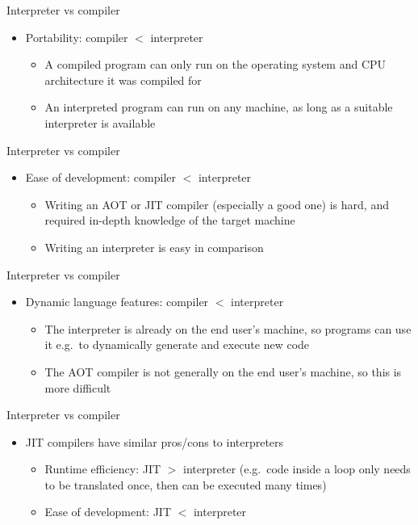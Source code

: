 \begin{frame}{Interpreter vs compiler}
    \begin{itemize}
        \item Portability: compiler $<$ interpreter \pause
        \begin{itemize}
            \item A compiled program can only run on the operating system and CPU architecture it was compiled for \pause
            \item An interpreted program can run on any machine, as long as a suitable interpreter is available
        \end{itemize}
    \end{itemize}
\end{frame}

\begin{frame}{Interpreter vs compiler}
    \begin{itemize}
        \item Ease of development: compiler $<$ interpreter \pause
        \begin{itemize}
            \item Writing an AOT or JIT compiler (especially a good one) is hard, and required in-depth knowledge of the target machine \pause
            \item Writing an interpreter is easy in comparison
        \end{itemize}
    \end{itemize}
\end{frame}

\begin{frame}{Interpreter vs compiler}
    \begin{itemize}
        \item Dynamic language features: compiler $<$ interpreter \pause
        \begin{itemize}
            \item The interpreter is already on the end user's machine, so programs can use it e.g.\ to dynamically generate and execute new code \pause
            \item The AOT compiler is not generally on the end user's machine, so this is more difficult
        \end{itemize}
    \end{itemize}
\end{frame}

\begin{frame}{Interpreter vs compiler}
    \begin{itemize}
        \pause\item JIT compilers have similar pros/cons to interpreters
					\begin{itemize}
						\pause\item Runtime efficiency: JIT $>$ interpreter (e.g.\ code inside a loop only needs to be translated once, then can be executed many times)
						\pause\item Ease of development: JIT $<$ interpreter
					\end{itemize}
    \end{itemize}
\end{frame}

